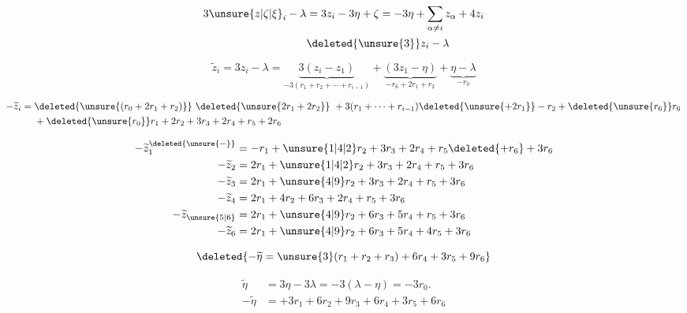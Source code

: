 
\deleted{%
\[
\begin{aligned}
&\deleted{x-w}&&r_0-2r_1-r_2+r_6\\
&\deleted{x-s_r(x)}\\
&s_r(x):x+(r,x)r&&r_1+2r_2+3r_3+2r_4+r_5+3r_6\\
&s_r(x)-x=(r,x)r\\
&(r,x)\in\{0,1,-1\}&&\alpha_1\\
&(\deleted{x-y}\quad s_rx-x=\\
&\deleted{x-wx=}\\
&wx=x+\rho\qquad \rho\ \text{\unsure{racine|vecteur}}\\
&s_rwx=s_rx+s_r\rho=x+\underbrace{(x,r)}_{\varepsilon}r+s_r\rho\\
&a)\ (x,r)=0\quad\text{i.e. }s_rx=x\quad\text{\unsure{on gagne}}\\
&b)\ (x,r)=1\\
&\quad\text{\unsure{on trouve}}\quad s_rwx-x=s_r\rho+r
\end{aligned}
\]
}

\[
\begin{aligned}
3\unsure{z|\zeta|\xi}_i-\lambda&=3z_i-3\eta+\zeta=-3\eta+\sum_{\alpha\ne i}z_\alpha+4z_i\\
&\deleted{\unsure{3}}z_i-\lambda
\end{aligned}
\]

\[
\widetilde z_i=3z_i-\lambda
=\underbrace{3(z_i-z_1)}_{-3(r_1+r_2+\cdots+r_{i-1})}
+\underbrace{(3z_1-\eta)}_{-r_6+2r_1+r_2}
+\underbrace{\eta-\lambda}_{-r_0}
\]

\[
\begin{aligned}
-\widetilde z_i={}&\deleted{\unsure{(r_0+2r_1+r_2)}}\ \deleted{\unsure{2r_1+2r_2}}\
+3(r_1+\cdots+r_{i-1})\deleted{\unsure{+2r_1}}-r_2+\deleted{\unsure{r_6}}r_6\\
&+\deleted{\unsure{r_0}}r_1+2r_2+3r_3+2r_4+r_5+2r_6
\end{aligned}
\]

\[
\begin{aligned}
-\widetilde z_1^{\deleted{\unsure{-}}}&=-r_1+\unsure{1|4|2}r_2+3r_3+2r_4+r_5\deleted{+r_6}+3r_6\\
-\widetilde z_{2}&=2r_1+\unsure{1|4|2}r_2+3r_3+2r_4+r_5+3r_6\\
-\widetilde z_3&=2r_1+\unsure{4|9}r_2+3r_3+2r_4+r_5+3r_6\\
-\widetilde z_4&=2r_1+4r_2+6r_3+2r_4+r_5+3r_6\\
-\widetilde z_{\unsure{5|6}}&=2r_1+\unsure{4|9}r_2+6r_3+5r_4+r_5+3r_6\\
-\widetilde z_6&=2r_1+\unsure{4|9}r_2+6r_3+5r_4+4r_5+3r_6
\end{aligned}
\]

\[
\deleted{-\widetilde\eta=\unsure{3}(r_1+r_2+r_3)+6r_4+3r_5+9r_6}
\]

\[
\begin{aligned}
\widetilde\eta&=3\eta-3\lambda=-3(\lambda-\eta)=-3r_0.\\
-\widetilde\eta&=+3r_1+6r_2+9r_3+6r_4+3r_5+6r_6
\end{aligned}
\]

